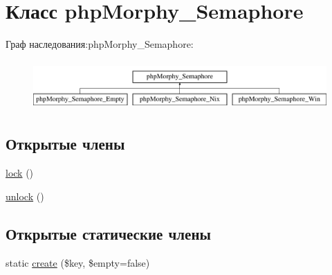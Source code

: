 \hypertarget{classphpMorphy__Semaphore}{
\section{Класс phpMorphy\_\-Semaphore}
\label{classphpMorphy__Semaphore}
}
Граф наследования:phpMorphy\_\-Semaphore:\begin{figure}[H]
\begin{center}
\leavevmode
\includegraphics[height=1.895093cm]{classphpMorphy__Semaphore}
\end{center}
\end{figure}
\subsection*{Открытые члены}
\begin{DoxyCompactItemize}
\item 
\hyperlink{classphpMorphy__Semaphore_a253d5cdd8b58eacc0b0f10ce9c04a618}{lock} ()
\item 
\hyperlink{classphpMorphy__Semaphore_acec635ad99b21b4f7ab6df94d2c7915b}{unlock} ()
\end{DoxyCompactItemize}
\subsection*{Открытые статические члены}
\begin{DoxyCompactItemize}
\item 
static \hyperlink{classphpMorphy__Semaphore_a2aa3e83eab57d4e99001f67ba70a6796}{create} (\$key, \$empty=false)
\end{DoxyCompactItemize}


